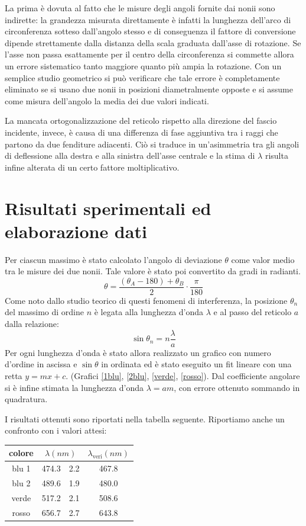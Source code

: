 \documentclass[italian,a4paper]{article}
\begin{document}
La prima è dovuta al fatto che le misure degli angoli fornite dai nonii sono indirette: la grandezza misurata direttamente è infatti la lunghezza dell'arco di circonferenza sotteso dall'angolo stesso e di conseguenza il fattore di conversione dipende strettamente dalla distanza della scala graduata dall'asse di rotazione. Se l'asse non passa esattamente per il centro della circonferenza si commette allora un errore sistematico tanto maggiore quanto più ampia  la rotazione. Con un semplice studio geometrico si può verificare che tale errore è completamente eliminato se si usano due nonii in posizioni diametralmente opposte e si assume come misura dell'angolo la media dei due valori indicati.

La mancata ortogonalizzazione del reticolo rispetto alla direzione del fascio incidente, invece, è causa di una differenza di fase aggiuntiva tra i raggi che partono da due fenditure adiacenti. Ciò si traduce in un'asimmetria tra gli angoli di deflessione alla destra e alla sinistra dell'asse centrale e la stima di $\lambda$ risulta infine alterata di un certo fattore moltiplicativo.

\section{Risultati sperimentali ed elaborazione dati}
Per ciascun massimo è stato calcolato l'angolo di deviazione $\theta$ come valor medio tra le misure dei due nonii. Tale valore è stato poi convertito da gradi in radianti.
\begin{equation*}
\theta=\dfrac{(\theta_A-180)+\theta_B}{2}\cdot\dfrac{\pi}{180}
\end{equation*}
Come noto dallo studio teorico di questi fenomeni di interferenza, la posizione $\theta_n$ del massimo di ordine $n$ è legata alla lunghezza d'onda $\lambda$ e al passo del reticolo $a$ dalla relazione:
\begin{equation*}
\sin\theta_n=n\dfrac{\lambda}{a}
\end{equation*}
Per ogni lunghezza d'onda è stato allora realizzato un grafico con numero d'ordine in ascissa e $\sin\theta$ in ordinata ed è stato eseguito un fit lineare con una retta $y=mx+c$. (Grafici \ref{1blu}, \ref{2blu}, \ref{verde}, \ref{rosso}).
Dal coefficiente angolare si è infine stimata la lunghezza d'onda $\lambda=a m$, con errore ottenuto sommando in quadratura.

\newpage
I risultati ottenuti sono riportati nella tabella seguente. Riportiamo anche
un confronto con i valori attesi:
\begin{table}[!h]
\centering
\renewcommand{\arraystretch}{1.3}
\begin{tabular}{cr@{ $\pm$ }l c}
colore&	\multicolumn{2}{c}{$\lambda (\unit{nm})$} &
$\lambda_{\text{veri}} (\unit{nm})$\\\hline
blu 1& 		474.3& 2.2 &467.8\\
blu 2& 		489.6& 1.9 &480.0\\
verde& 		517.2& 2.1 &508.6\\
rosso& 		656.7& 2.7 &643.8\\
\end{tabular}
\end{table}
\end{document}
